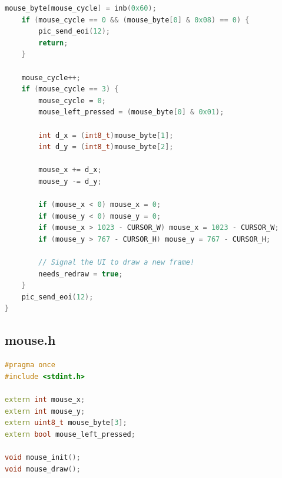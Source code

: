 \documentclass[12pt,a4paper]{report}
\begin{document}
\begin{lstlisting}[language={C++}]
    mouse_byte[mouse_cycle] = inb(0x60); 
    if (mouse_cycle == 0 && (mouse_byte[0] & 0x08) == 0) {
        pic_send_eoi(12);
        return;
    }
    
    mouse_cycle++; 
    if (mouse_cycle == 3) {
        mouse_cycle = 0; 
        mouse_left_pressed = (mouse_byte[0] & 0x01);
        
        int d_x = (int8_t)mouse_byte[1]; 
        int d_y = (int8_t)mouse_byte[2]; 
        
        mouse_x += d_x;
        mouse_y -= d_y; 
        
        if (mouse_x < 0) mouse_x = 0;
        if (mouse_y < 0) mouse_y = 0;
        if (mouse_x > 1023 - CURSOR_W) mouse_x = 1023 - CURSOR_W; 
        if (mouse_y > 767 - CURSOR_H) mouse_y = 767 - CURSOR_H;   
        
        // Signal the UI to draw a new frame!
        needs_redraw = true;
    }
    pic_send_eoi(12); 
}

\end{lstlisting}

\subsection{mouse.h}
\begin{lstlisting}[language={C++}]
#pragma once
#include <stdint.h>

extern int mouse_x;
extern int mouse_y;
extern uint8_t mouse_byte[3];
extern bool mouse_left_pressed;

void mouse_init();
void mouse_draw();

\end{lstlisting}
\end{document}
